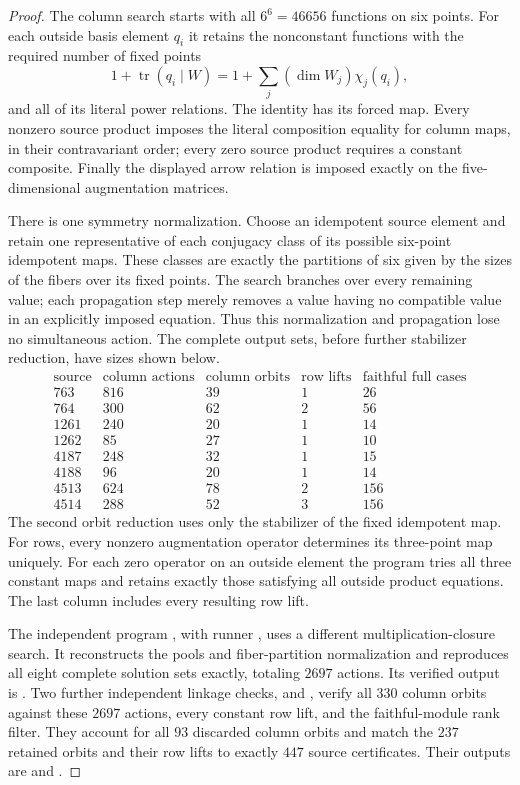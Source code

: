 \begin{proof}
The column search  starts
with all $6^6=46656$ functions on six points.  For each outside
basis element $q_i$ it retains the nonconstant functions with
the required number of fixed points
\[
 1+\operatorname{tr}(q_i\mid W)
 =1+\sum_j(\dim W_j)\chi_j(q_i),
\]
and all of its literal power relations.  The identity has its
forced map.  Every nonzero source product imposes the literal
composition equality for column maps, in their contravariant
order; every zero source product requires a constant composite.
Finally the displayed arrow relation is imposed exactly on the
five-dimensional augmentation matrices.

There is one symmetry normalization.  Choose an idempotent source
element and retain one representative of each conjugacy class of
its possible six-point idempotent maps.  These classes are exactly
the partitions of six given by the sizes of the fibers over its
fixed points.  The search branches over every remaining value;
each propagation step merely removes a value having no compatible
value in an explicitly imposed equation.  Thus this normalization
and propagation lose no simultaneous action.  The complete output
sets, before further stabilizer reduction, have sizes shown below.
\[
\begin{array}{c|r|r|r|r}
\text{source}&\text{column actions}&\text{column orbits}&
\text{row lifts}&\text{faithful full cases}\\\hline
763&816&39&1&26\\
764&300&62&2&56\\
1261&240&20&1&14\\
1262&85&27&1&10\\
4187&248&32&1&15\\
4188&96&20&1&14\\
4513&624&78&2&156\\
4514&288&52&3&156
\end{array}
\]
The second orbit reduction uses only the stabilizer of the fixed
idempotent map.  For rows, every nonzero augmentation operator
determines its three-point map uniquely.  For each zero operator
on an outside element the program tries all three constant maps
and retains exactly those satisfying all outside product equations.
The last column includes every resulting row lift.

The independent program
, with runner
, uses a different
multiplication-closure search.  It reconstructs the pools and
fiber-partition normalization and reproduces all eight complete
solution sets exactly, totaling $2697$ actions.  Its verified
output is .
Two further independent linkage checks,
 and
, verify all $330$
column orbits against these $2697$ actions, every constant row
lift, and the faithful-module rank filter.  They account for all
$93$ discarded column orbits and match the $237$ retained orbits
and their row lifts to exactly $447$ source certificates.  Their
outputs are  and
.


\end{proof}
